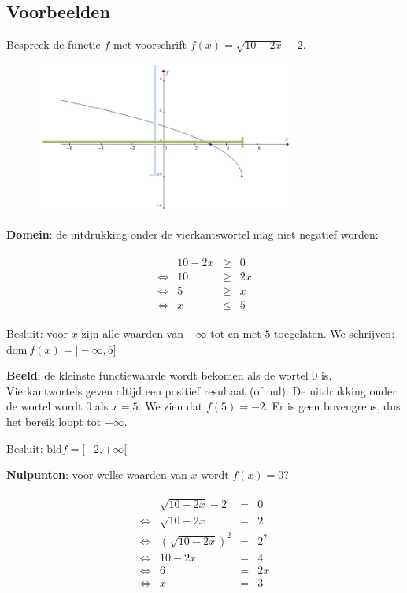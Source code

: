 \subsection{Voorbeelden}



\begin{voorbeeld}
	Bespreek de functie $f$ met voorschrift $f(x)=\sqrt{10-2x}-2$.

\begin{figure}[h]
	\centering{}\includegraphics[height=5cm]{2_elem_rekenvaardigheden_B/inputs/reeel_vb1.jpg} 
\end{figure}


\textbf{Domein}: de uitdrukking onder de vierkantswortel
mag niet negatief worden:


\begin{eqnarray*}
	\begin{array}{cccc}
		& 10-2x & \geqslant & 0\\
		\iff & 10 & \geqslant & 2x\\
		\iff & 5 & \geqslant & x\\
		\iff & x & \leqslant & 5
	\end{array}
\end{eqnarray*}


Besluit: voor $x$ zijn alle waarden van $-\infty$ tot
en met $5$ toegelaten. We schrijven: $\textrm{dom}\ f(x)=]-\infty,5]$ 

\textbf{Beeld}: de kleinste functiewaarde wordt
bekomen als de wortel $0$ is. Vierkantwortels geven altijd een positief
resultaat (of nul). De uitdrukking onder de wortel wordt $0$ als
$x=5$. We zien dat $f(5)=-2$. Er is geen bovengrens, dus het bereik
loopt tot $+\infty$.

Besluit: $\textrm{bld}f=[-2,+\infty[$




\textbf{Nulpunten}: voor welke waarden van $x$ wordt $f(x)=0$?


\begin{eqnarray*}
	\begin{array}{cccc}
		& \sqrt{10-2x}-2 & = & 0\\
		\iff & \sqrt{10-2x} & = & 2\\
		\iff & \left(\sqrt{10-2x}\right)^{2} & = & 2^{2}\\
		\iff & 10-2x & = & 4\\
		\iff & 6 & = & 2x\\
		\iff & x & = & 3
	\end{array}
\end{eqnarray*}



\end{voorbeeld}
